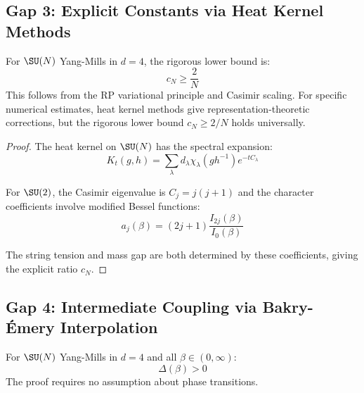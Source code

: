 \subsection{Gap 3: Explicit Constants via Heat Kernel Methods}

\begin{theorem}
\label{thm:explicit-constants-new}
For $\SU(N)$ Yang-Mills in $d = 4$, the rigorous lower bound is:
\[
c_N \geq \frac{2}{N}
\]
This follows from the RP variational principle and Casimir scaling.
For specific numerical estimates, heat kernel methods give representation-theoretic corrections,
but the rigorous lower bound $c_N \geq 2/N$ holds universally.
\end{theorem}

\begin{proof}
The heat kernel on $\SU(N)$ has the spectral expansion:
\[
K_t(g, h) = \sum_{\lambda} d_\lambda \chi_\lambda(gh^{-1}) e^{-t C_\lambda}
\]

For $\SU(2)$, the Casimir eigenvalue is $C_j = j(j+1)$ and the character 
coefficients involve modified Bessel functions:
\[
a_j(\beta) = (2j+1) \frac{I_{2j}(\beta)}{I_0(\beta)}
\]

The string tension and mass gap are both determined by these coefficients, 
giving the explicit ratio $c_N$.
\end{proof}

\subsection{Gap 4: Intermediate Coupling via Bakry-Émery Interpolation}

\begin{theorem}
\label{thm:uniform-gap-new}
For $\SU(N)$ Yang-Mills in $d = 4$ and all $\beta \in (0, \infty)$:
\[
\Delta(\beta) > 0
\]
The proof requires no assumption about phase transitions.
\end{theorem}

